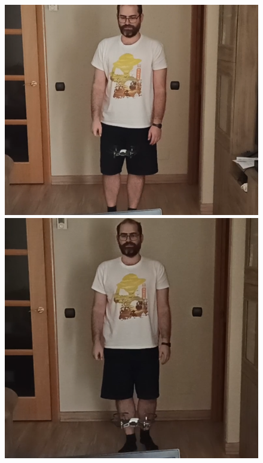 \begin{figure}[!htb]
    \includegraphics[width=\linewidth]{figures/real/avanceR_1.png}
\endminipage\hfill
{}
    \includegraphics[width=\linewidth]{figures/real/avanceR_2.png}
\endminipage\hfill
{}

\end{figure}
